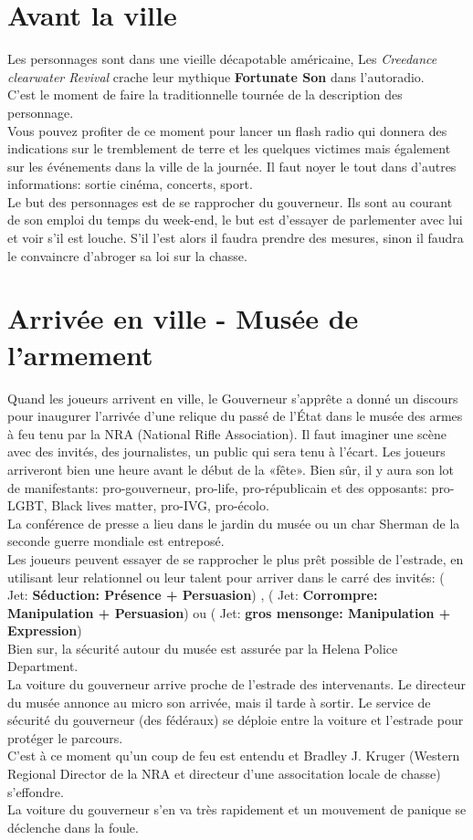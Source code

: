 \documentclass[oneside,12pt]{book}
\newcommand\roll[1]{
( Jet: \textbf{#1})
}
\begin{document}
\begin{flushleft}
\section{Avant la ville}
Les personnages sont dans une vieille décapotable américaine, Les \textit{Creedance clearwater Revival} crache leur mythique \textbf{Fortunate Son} dans l’autoradio.\\
C’est le moment de faire la traditionnelle tournée de la description des personnage. \\
Vous pouvez profiter de ce moment pour lancer un flash radio qui donnera des indications sur le tremblement de terre et les quelques victimes mais également sur les événements dans la ville de la journée. Il faut noyer le tout dans d’autres informations: sortie cinéma, concerts, sport.\\
Le but des personnages est de se rapprocher du gouverneur. Ils sont au courant de son emploi du temps du week-end, le but est d’essayer de parlementer avec lui et  voir s’il est louche. S’il l’est alors il faudra prendre des mesures, sinon il faudra le convaincre d’abroger sa loi sur la chasse.


\section{Arrivée en ville - Musée de l’armement}
Quand les joueurs arrivent en ville, le Gouverneur s’apprête a donné un discours pour inaugurer l’arrivée d’une relique du passé de l’État dans le musée des armes à feu tenu par la NRA (National Rifle Association).
Il faut imaginer une scène avec des invités, des journalistes, un public qui sera tenu à l’écart. Les joueurs arriveront bien une heure avant le début de la «fête». Bien sûr, il y aura son lot de manifestants: pro-gouverneur, pro-life, pro-républicain et des opposants: pro-LGBT, Black lives matter, pro-IVG, pro-écolo.\\
La conférence de presse a lieu dans le jardin du musée ou un char Sherman de la seconde guerre mondiale est entreposé.\\
Les joueurs peuvent essayer de se rapprocher le plus prêt possible de l’estrade, en utilisant leur relationnel ou leur talent pour arriver dans le carré des invités: \roll{Séduction: Présence + Persuasion}, \roll{Corrompre: Manipulation + Persuasion} ou \roll{gros mensonge: Manipulation + Expression} \\ 
Bien sur, la sécurité autour du musée est assurée par la Helena Police Department. \\
La voiture du gouverneur arrive proche de l’estrade des intervenants. Le directeur du musée annonce au micro son arrivée, mais il tarde à sortir. Le service de sécurité du gouverneur (des fédéraux) se déploie entre la voiture et l’estrade pour protéger le parcours.\\
C’est à ce moment qu’un coup de feu est entendu et Bradley J. Kruger (Western Regional Director de la NRA et directeur d’une associtation locale de chasse) s’effondre.\\ La voiture du gouverneur s’en va très rapidement et un mouvement de panique se déclenche dans la foule.\\ 


\end{flushleft}
\end{document}
